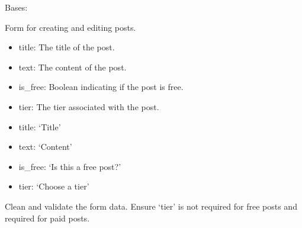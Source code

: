 \documentclass[letterpaper,10pt,english]{sphinxmanual}
\begin{document}
\begin{fulllineitems}
\label{\detokenize{modules/forms:creator.forms.PostForm}}
\pysigstartsignatures
{}
\pysigstopsignatures
\sphinxAtStartPar
Bases: 

\sphinxAtStartPar
Form for creating and editing posts.
\begin{description}
\begin{itemize}
\item {} 
\sphinxAtStartPar
title: The title of the post.

\item {} 
\sphinxAtStartPar
text: The content of the post.

\item {} 
\sphinxAtStartPar
is\_free: Boolean indicating if the post is free.

\item {} 
\sphinxAtStartPar
tier: The tier associated with the post.

\end{itemize}

\begin{itemize}
\item {} 
\sphinxAtStartPar
title: ‘Title’

\item {} 
\sphinxAtStartPar
text: ‘Content’

\item {} 
\sphinxAtStartPar
is\_free: ‘Is this a free post?’

\item {} 
\sphinxAtStartPar
tier: ‘Choose a tier’

\end{itemize}

\end{description}

\begin{fulllineitems}
\label{\detokenize{modules/forms:creator.forms.PostForm.clean}}
\pysigstartsignatures
{}
\pysigstopsignatures
\sphinxAtStartPar
Clean and validate the form data.
Ensure ‘tier’ is not required for free posts and required for paid posts.


\end{fulllineitems}
\end{fulllineitems}
\end{document}
